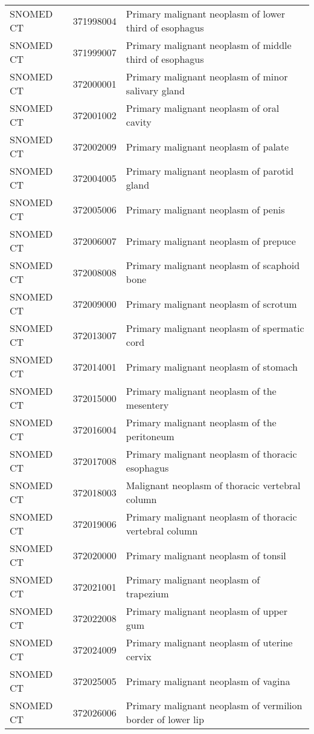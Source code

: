 \begin{longtable}{p{}p{}p{}}
  SNOMED CT & 371998004 & Primary malignant neoplasm of lower third of esophagus \\ 
  SNOMED CT & 371999007 & Primary malignant neoplasm of middle third of esophagus \\ 
  SNOMED CT & 372000001 & Primary malignant neoplasm of minor salivary gland \\ 
  SNOMED CT & 372001002 & Primary malignant neoplasm of oral cavity \\ 
  SNOMED CT & 372002009 & Primary malignant neoplasm of palate \\ 
  SNOMED CT & 372004005 & Primary malignant neoplasm of parotid gland \\ 
  SNOMED CT & 372005006 & Primary malignant neoplasm of penis \\ 
  SNOMED CT & 372006007 & Primary malignant neoplasm of prepuce \\ 
  SNOMED CT & 372008008 & Primary malignant neoplasm of scaphoid bone \\ 
  SNOMED CT & 372009000 & Primary malignant neoplasm of scrotum \\ 
  SNOMED CT & 372013007 & Primary malignant neoplasm of spermatic cord \\ 
  SNOMED CT & 372014001 & Primary malignant neoplasm of stomach \\ 
  SNOMED CT & 372015000 & Primary malignant neoplasm of the mesentery \\ 
  SNOMED CT & 372016004 & Primary malignant neoplasm of the peritoneum \\ 
  SNOMED CT & 372017008 & Primary malignant neoplasm of thoracic esophagus \\ 
  SNOMED CT & 372018003 & Malignant neoplasm of thoracic vertebral column \\ 
  SNOMED CT & 372019006 & Primary malignant neoplasm of thoracic vertebral column \\ 
  SNOMED CT & 372020000 & Primary malignant neoplasm of tonsil \\ 
  SNOMED CT & 372021001 & Primary malignant neoplasm of trapezium \\ 
  SNOMED CT & 372022008 & Primary malignant neoplasm of upper gum \\ 
  SNOMED CT & 372024009 & Primary malignant neoplasm of uterine cervix \\ 
  SNOMED CT & 372025005 & Primary malignant neoplasm of vagina \\ 
  SNOMED CT & 372026006 & Primary malignant neoplasm of vermilion border of lower lip \\ 

\end{longtable}
